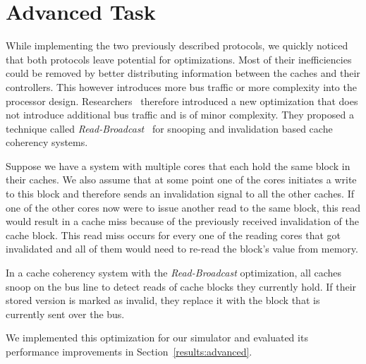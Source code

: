 \section{Advanced Task}\label{sec:advanced_task}
While implementing the two previously described protocols, we quickly noticed that both protocols
leave potential for optimizations. Most of their inefficiencies could be removed by better
distributing information between the caches and their controllers. This however introduces more bus
traffic or more complexity into the processor design. Researchers~\cite{read_broadcast_prop1,
    read_broadcast_prop2, read_broadcast_prop3} therefore introduced a new
optimization that does not introduce additional bus traffic and is of minor complexity. They
proposed a technique called \emph{Read-Broadcast}~\cite{read_broadcast_analysis} for snooping and
invalidation based cache coherency systems.

Suppose we have a system with multiple cores that each hold the same block in their caches. We also
assume that at some point one of the cores initiates a write to this block and therefore sends an
invalidation signal to all the other caches. If one of the other cores now were to issue another
read to the same block, this read would result in a cache miss because of the previously received
invalidation of the cache block. This read miss occurs for every one of the reading cores that got
invalidated and all of them would need to re-read the block's value from memory.

In a cache coherency system with the \emph{Read-Broadcast} optimization, all caches snoop on the bus
line to detect reads of cache blocks they currently hold. If their stored version is marked as
invalid, they replace it with the block that is currently sent over the bus.

We implemented this optimization for our simulator and evaluated its performance improvements in
Section~\ref{results:advanced}.
